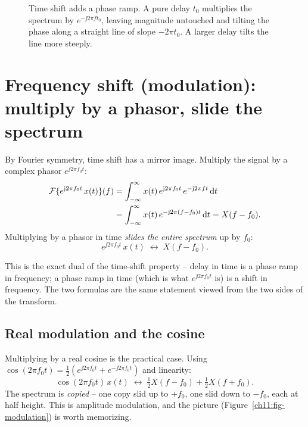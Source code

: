 \begin{figure}[H]
\centering
{}
\caption{Time shift adds a phase ramp. A pure delay $t_0$ multiplies the spectrum
by $e^{-\jj 2\pi f t_0}$, leaving magnitude untouched and tilting the phase along
a straight line of slope $-2\pi t_0$. A larger delay tilts the line more
steeply.}
\label{ch11:fig-linear-phase}
\end{figure}

\section{Frequency shift (modulation): multiply by a phasor, slide the spectrum}
\label{ch11:freq-shift}

By Fourier symmetry, time shift has a mirror image. Multiply the
signal by a complex phasor $e^{\jj 2\pi f_0 t}$:
\begin{align}
\mathcal{F}\{e^{\mathrm{j} 2\pi f_0 t}\, x(t)\}(f)
&= \int_{-\infty}^{\infty} x(t)\, e^{\mathrm{j} 2\pi f_0 t}\, e^{-\mathrm{j} 2\pi f t}\, \mathrm{d} t
\nonumber\\
&= \int_{-\infty}^{\infty} x(t)\, e^{-\mathrm{j} 2\pi (f - f_0) t}\, \mathrm{d} t
= X(f - f_0).
\label{ch11:freq-shift-result}
\end{align}
Multiplying by a phasor in time \emph{slides the entire spectrum} up by $f_0$:
\[
e^{\jj 2\pi f_0 t}\, x(t) \;\longleftrightarrow\; X(f - f_0).
\]

This is the exact dual of the time-shift property -- delay in time is a phase
ramp in frequency; a phase ramp in time (which is what $e^{\jj 2\pi f_0 t}$ is)
is a shift in frequency. The two formulas are the same statement viewed from the
two sides of the transform.

\subsection{Real modulation and the cosine}

Multiplying by a real cosine is the practical case. Using
$\cos(2\pi f_0 t) = \tfrac12(e^{\jj 2\pi f_0 t} + e^{-\jj 2\pi f_0 t})$ and
linearity:
\[
\cos(2\pi f_0 t)\, x(t) \;\longleftrightarrow\;
\tfrac12 X(f - f_0) + \tfrac12 X(f + f_0).
\]
The spectrum is \emph{copied} -- one copy slid up to $+f_0$, one slid down to
$-f_0$, each at half height. This is amplitude modulation, and the picture
(Figure~\ref{ch11:fig-modulation}) is worth memorizing.

